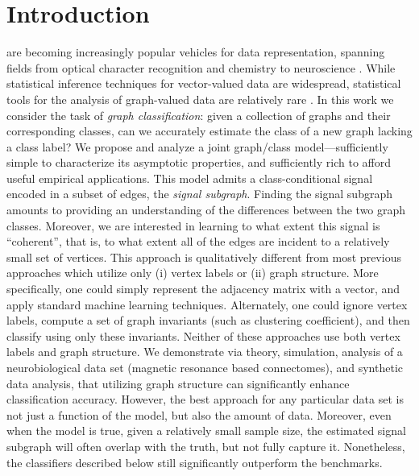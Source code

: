 \documentclass[10pt,journal,cspaper,compsoc]{IEEEtran}
\begin{document}
\maketitle
\IEEEdisplaynotcompsoctitleabstractindextext
\IEEEpeerreviewmaketitle



\section{Introduction}

 are becoming increasingly popular vehicles for data representation, spanning fields from optical character recognition and chemistry \cite{Bunke2011} to neuroscience \cite{Hagmann2010}.  While statistical inference techniques for vector-valued data are widespread, statistical tools for the analysis of graph-valued data are relatively rare \cite{Bunke2011}. In this work we consider the task of \emph{graph classification}: given a collection of graphs and their corresponding classes, can we accurately estimate the class of a new graph lacking a class label?  We propose and analyze a joint graph/class model---sufficiently simple to characterize its asymptotic properties, and sufficiently rich to afford useful empirical applications.  This model admits a class-conditional signal encoded in a subset of edges, the \emph{signal subgraph}. Finding the signal subgraph amounts to providing an understanding of the differences between the two graph classes.  Moreover, we are interested in learning to what extent this signal is ``coherent'', that is, to what extent all of the edges are incident to a relatively small set of vertices.  This approach is qualitatively different from most previous approaches which utilize only (i) vertex labels or (ii) graph structure.  More specifically, one could simply represent the adjacency matrix with a vector, and apply standard machine learning techniques.  Alternately, one could ignore vertex labels, compute a set of graph invariants (such as clustering coefficient), and then classify using only these invariants.  Neither of these approaches use both vertex labels and graph structure.  We demonstrate via theory, simulation, analysis of a neurobiological data set (magnetic resonance based connectomes), and synthetic data analysis, that utilizing graph structure can significantly enhance classification accuracy.  However, the best approach for any particular data set is not just a function of the model, but also the amount of data.  Moreover, even when the model is true, given a relatively small sample size, the estimated signal subgraph will often overlap with the truth, but not fully capture it.  Nonetheless, the classifiers described below still significantly outperform the benchmarks.
\end{document}
